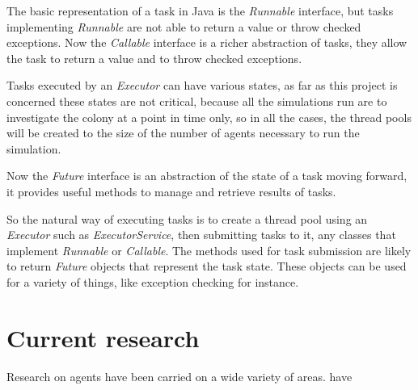 The basic representation of a task in Java is the \emph{Runnable} interface, but tasks implementing \emph{Runnable} are not able to return a value or throw checked exceptions.\cite{goetz2006java} Now the \emph{Callable} interface is a richer abstraction of tasks, they allow the task to return a value and to throw checked exceptions. 

Tasks executed by an \emph{Executor} can have various states, as far as this project is concerned these states are not critical, because all the simulations run are to investigate the colony at a point in time only, so in all the cases, the thread pools will be created to the size of the number of agents necessary to run the simulation.

Now the \emph{Future} interface is an abstraction of the state of a task moving forward, it provides useful methods to manage and retrieve results of tasks.

So the natural way of executing tasks is to create a thread pool using an \emph{Executor} such as \emph{ExecutorService}, then submitting tasks to it, any classes that implement \emph{Runnable} or \emph{Callable}. The methods used for task submission are likely to return \emph{Future} objects that represent the task state. These objects can be used for a variety of things, like exception checking for instance.

\section{Current research}

Research on agents have been carried on a wide variety of areas.  \citeauthor{994150} \citealt{994150} have 